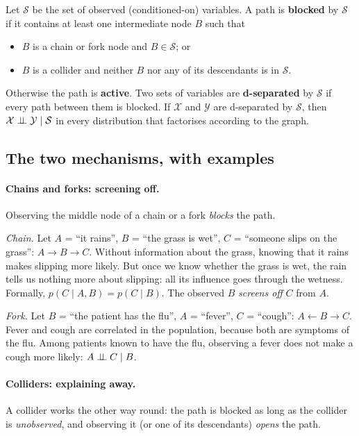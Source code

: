 Let $\mathcal{S}$ be the set of observed (conditioned-on) variables. A
path is \textbf{blocked} by $\mathcal{S}$ if it contains at least one
intermediate node $B$ such that
\begin{itemize}
    \item $B$ is a chain or fork node and $B \in \mathcal{S}$; or
    \item $B$ is a collider and neither $B$ nor any of its descendants is
    in $\mathcal{S}$.
\end{itemize}
Otherwise the path is \textbf{active}. Two sets of variables are
\textbf{d-separated} by $\mathcal{S}$ if every path between them is
blocked. If $\mathcal{X}$ and $\mathcal{Y}$ are d-separated by
$\mathcal{S}$, then $\mathcal{X} \perp\!\!\!\perp \mathcal{Y} \mid \mathcal{S}$ in
every distribution that factorises according to the graph.

\subsection*{The two mechanisms, with examples}

\paragraph{Chains and forks: screening off.}
Observing the middle node of a chain or a fork \emph{blocks} the path.

\emph{Chain.} Let $A$ = \enquote{it rains}, $B$ = \enquote{the grass is
wet}, $C$ = \enquote{someone slips on the grass}:
$A \rightarrow B \rightarrow C$. Without information about the grass,
knowing that it rains makes slipping more likely. But once we know
whether the grass is wet, the rain tells us nothing more about slipping:
all its influence goes through the wetness. Formally,
$p(C \mid A, B) = p(C \mid B)$. The observed $B$ \emph{screens off} $C$
from $A$.

\emph{Fork.} Let $B$ = \enquote{the patient has the flu}, $A$ =
\enquote{fever}, $C$ = \enquote{cough}: $A \leftarrow B \rightarrow C$.
Fever and cough are correlated in the population, because both are
symptoms of the flu. Among patients known to have the flu, observing a
fever does not make a cough more likely: $A \perp\!\!\!\perp C \mid B$.

\paragraph{Colliders: explaining away.}
A collider works the other way round: the path is blocked as long as the
collider is \emph{unobserved}, and observing it (or one of its
descendants) \emph{opens} the path.

